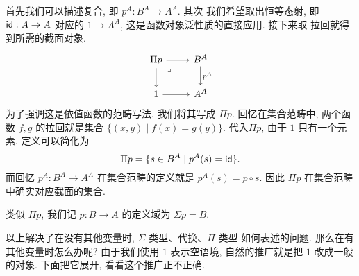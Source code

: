 首先我们可以描述复合, 即 \(p^A : B^A \to A^A\). 其次
我们希望取出恒等态射, 即 \(\textsf{id}:A \to A\) 对应的
\(1 \to A^A\), 这是函数对象泛性质的直接应用. 接下来取
拉回就得到所需的截面对象.
\[\begin{tikzcd}
  {\Pi p} & {B^A} \\
  1 & {A^A}
  \arrow["{p^A}", from=1-2, to=2-2]
  \arrow[from=2-1, to=2-2]
  \arrow[from=1-1, to=2-1]
  \arrow[from=1-1, to=1-2]
  \arrow["\lrcorner"{anchor=center, pos=0.125}, draw=none, from=1-1, to=2-2]
\end{tikzcd}\]
为了强调这是依值函数的范畴写法, 我们将其写成 \(\Pi p\).
回忆在集合范畴中, 两个函数 \(f,g\) 的拉回就是集合
\(\{(x,y) \mid f(x) = g(y)\}\). 代入\(\Pi p\), 
由于 \(1\) 只有一个元素, 定义可以简化为
\[\Pi p = \{ s \in B^A \mid p^A(s) = \textsf{id}\}.\]
而回忆 \(p^A : B^A \to A^A\) 在集合范畴的定义就是
\(p^A(s) = p \circ s\). 因此 \(\Pi p\) 在集合范畴
中确实对应截面的集合.

类似 \(\Pi p\), 我们记 \(p : B \to A\) 的定义域为 \(\Sigma p = B\).

以上解决了在没有其他变量时, \(\Sigma\)-类型、代换、\(\Pi\)-类型
如何表述的问题. 那么在有其他变量时怎么办呢? 由于我们使用
\(1\) 表示空语境, 自然的推广就是把 \(1\) 改成一般的对象.
下面把它展开, 看看这个推广正不正确.

